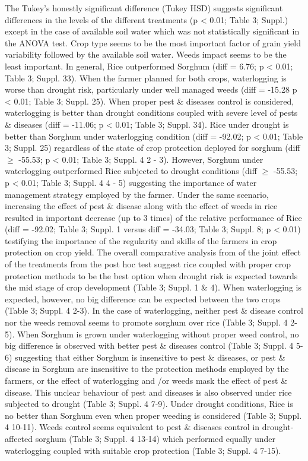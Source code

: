 \documentclass[11pt,preprint]{article}
\begin{document}
The Tukey's honestly significant difference (Tukey HSD) suggests
significant differences in the levels of the different treatments (p
\textless{} 0.01; Table 3; Suppl.) except in the case of available soil
water which was not statistically significant in the ANOVA test. Crop
type seems to be the most important factor of grain yield variability
followed by the available soil water. Weeds impact seems to be the least
important. In general, Rice outperformed Sorghum (diff = 6.76; p
\textless{} 0.01; Table 3; Suppl. 33). When the farmer planned for both
crops, waterlogging is worse than drought risk, particularly under well
managed weeds (diff = -15.28 p \textless{} 0.01; Table 3; Suppl. 25).
When proper pest \& diseases control is considered, waterlogging is
better than drought conditions coupled with severe level of pests \&
diseases (diff = -11.06; p \textless{} 0.01; Table 3; Suppl. 34). Rice
under drought is better than Sorghum under waterlogging condition (diff
= -92.02; p \textless{} 0.01; Table 3; Suppl. 25) regardless of the
state of crop protection deployed for sorghum (diff \(\geq\) -55.53; p
\textless{} 0.01; Table 3; Suppl. 4 2 - 3). However, Sorghum under
waterlogging outperformed Rice subjected to drought conditions (diff
\(\geq\) -55.53; p \textless{} 0.01; Table 3; Suppl. 4 4 - 5) suggesting
the importance of water management strategy employed by the farmer.
Under the same scenario, increasing the effect of pest \& disease along
with the effect of weeds in rice resulted in important decrease (up to 3
times) of the relative performance of Rice (diff = -92.02; Table 3;
Suppl. 1 versus diff = -34.03; Table 3; Suppl. 8; p \textless{} 0.01)
testifying the importance of the regularity and skills of the farmers in
crop protection on crop yield. The overall comparative analysis from of
the joint effect of the treatments from the post hoc test suggest rice
coupled with proper crop protection methods to be the best option when
drought risk is expected towards the mid stage of crop development
(Table 3; Suppl. 1 \& 4). When waterlogging is expected, however, no big
difference can be expected between the two crops (Table 3; Suppl. 4
2-3). In the case of waterlogging, neither pest \& disease control nor
the weeds removal seems to promote sorghum over rice (Table 3; Suppl. 4
2-5). When Sorghum is grown under waterlogging without proper weed
control, no big difference is observed with better pest \& diseases
control (Table 3; Suppl. 4 5-6) suggesting that either Sorghum is
insensitive to pest \& diseases, or pest \& disease in Sorghum are
insensitive to the protection methods employed by the farmers, or the
effect of waterlogging and /or weeds mask the effect of pest \& disease.
This unclear behaviour of pest and diseases is also observed under rice
subjected to drought (Table 3; Suppl. 4 7-9). Under drought conditions,
Rice is no better than Sorghum even when proper weeding is considered
(Table 3; Suppl. 4 10-11). Weeds control seems equivalent to pest \&
diseases control in drought-affected sorghum (Table 3; Suppl. 4 13-14)
which performed equally under waterlogging coupled with suitable crop
protection (Table 3; Suppl. 4 7-15).
\end{document}
